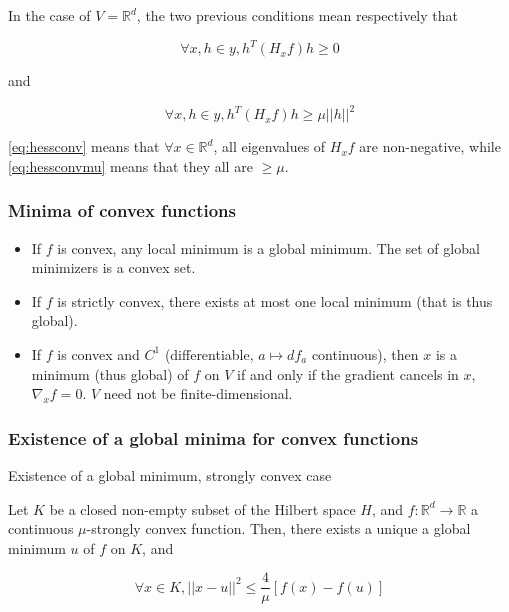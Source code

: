 \documentclass[
10pt, %
a4paper, %
oneside, %
headinclude,footinclude, %
BCOR5mm, %
]{scrartcl}
\begin{document}
\begin{remark}
    In the case of $V= \mathbb{R}^d$, the two previous conditions mean respectively that 

	    \begin{equation}
		\label{eq:hessconv}
		\forall x, h\in y, h^T(H_xf)h\geq 0
	    \end{equation}

	    and

	    \begin{equation}
		\label{eq:hessconvmu}
		\forall x, h\in y, h^T(H_xf)h\geq \mu ||h||^2
	    \end{equation}

	    \ref{eq:hessconv} means that $\forall x\in \mathbb{R}^d$, all eigenvalues of $H_xf$ are non-negative, while \ref{eq:hessconvmu} means that they all are $\geq \mu$.



\end{remark}

\subsubsection{\large\color{Periwinkle}Minima of convex functions}

\begin{proposition}
    \label{prop:miniconv}

    \begin{itemize}
        \item If $f$ is convex, any local minimum is a global minimum. The set of global minimizers is a convex set.
	\item If $f$ is strictly convex, there exists at most one local minimum (that is thus global).
	\item If $f$ is convex and $C^1$ (differentiable, $a\mapsto df_a$ continuous), then $x$ is a minimum (thus global) of $f$ on $V$ if and only if the gradient cancels in $x$, $\nabla_xf=0$. $V$ need not be finite-dimensional.
    \end{itemize}
\end{proposition}

\subsubsection{\large\color{Periwinkle}Existence of a global minima for convex functions}

\begin{theorem}{Existence of a global minimum, strongly convex case}
    \label{th:alphaconv}

    Let $K$ be a closed non-empty subset of the Hilbert space $H$, and $f: \mathbb{R}^d\rightarrow \mathbb{R} $ a continuous $\mu$-strongly convex function. Then, there exists a unique a global minimum $u$ of $f$ on $K$, and

    \begin{equation*}
	\forall x\in K, ||x-u||^2\leq \frac{4}{\mu} [ f(x)-f(u)]
    \end{equation*}
\end{theorem}
\end{document}
